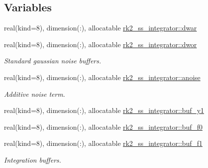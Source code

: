 \subsection*{Variables}
\begin{DoxyCompactItemize}
\item 
real(kind=8), dimension(\+:), allocatable \hyperlink{namespacerk2__ss__integrator_aa9dc56a3ff3887caced809dcb0257a1b}{rk2\+\_\+ss\+\_\+integrator\+::dwar}
\item 
real(kind=8), dimension(\+:), allocatable \hyperlink{namespacerk2__ss__integrator_aeae3507fa2e319b59923f21622b58fc7}{rk2\+\_\+ss\+\_\+integrator\+::dwor}
\begin{DoxyCompactList}\small\item\em Standard gaussian noise buffers. \end{DoxyCompactList}\item 
real(kind=8), dimension(\+:), allocatable \hyperlink{namespacerk2__ss__integrator_a26f660bf2b4b250a831c9fe4dc6c7726}{rk2\+\_\+ss\+\_\+integrator\+::anoise}
\begin{DoxyCompactList}\small\item\em Additive noise term. \end{DoxyCompactList}\item 
real(kind=8), dimension(\+:), allocatable \hyperlink{namespacerk2__ss__integrator_a8b6b195712dd95f7eafe269379aa9dcc}{rk2\+\_\+ss\+\_\+integrator\+::buf\+\_\+y1}
\item 
real(kind=8), dimension(\+:), allocatable \hyperlink{namespacerk2__ss__integrator_aebce0ce5ca95ff293f219a8f85d44851}{rk2\+\_\+ss\+\_\+integrator\+::buf\+\_\+f0}
\item 
real(kind=8), dimension(\+:), allocatable \hyperlink{namespacerk2__ss__integrator_a1ffae309b7f72f07c598ab1882634ab3}{rk2\+\_\+ss\+\_\+integrator\+::buf\+\_\+f1}
\begin{DoxyCompactList}\small\item\em Integration buffers. \end{DoxyCompactList}\end{DoxyCompactItemize}
